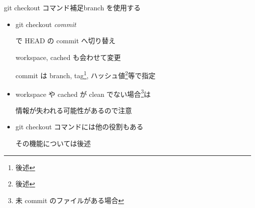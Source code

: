 \begin{frame}[t]{git checkout コマンド補足}{branch を使用する}

  \begin{itemize}
  \item git checkout \textit{commit}

    で HEAD の commit へ切り替え

    workspace, cached も会わせて変更

    commit は branch, tag\footnote{後述}, ハッシュ値\footnote{後述}等で指定
    \vspace{2ex}

  \item workspace や cached が clean でない場合\footnote{未 commit のファイルがある場合}は

    情報が失われる可能性があるので注意
    \vspace{2ex}

  \item git checkout コマンドには他の役割もある

    その機能については後述
  \end{itemize}

\end{frame}
